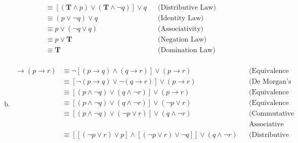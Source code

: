 \begin{itemize}
\begin{enumerate}[a.]
\begin{align*}
                         & \equiv [(\mathbf{T} \land p) \lor (\mathbf{T} \land \neg q)] \lor q &  & \text{(Distributive Law)}                    \\
                         & \equiv (p \lor \neg q) \lor q                                       &  & \text{(Identity Law)}                        \\
                         & \equiv p \lor (\neg q \lor q)                                       &  & \text{(Associativity)}                       \\
                         & \equiv p \lor \mathbf{T}                                            &  & \text{(Negation Law)}                        \\
                         & \equiv \mathbf{T}                                                   &  & \text{(Domination Law)}                      \\
                    \end{align*}
              \item  \begin{align*}
                        [(p \to  q)  \land  (q \to r)] \to (p \to r)
                         & \equiv \neg [(p \to q) \land (q \to r)] \lor (p \to r)                                          &  & \text{(Equivalence from table)} \\
                         & \equiv [\neg (p \to q) \lor \neg (q \to r)] \lor (p \to r)                                      &  & \text{(De Morgan's Law)}        \\
                         & \equiv [(p \land \neg q) \lor (q \land \neg r)] \lor (p \to r)                                  &  & \text{(Equivalence from table)} \\
                         & \equiv [(p \land \neg q) \lor (q \land \neg r)] \lor (\neg p \lor r)                            &  & \text{(Equivalence from table)} \\
                         & \equiv [(p \land \neg q) \lor (\neg p \lor r)] \lor (q \land \neg r)                            &  & \text{(Commutative \&}          \\
                         &                                                                                                 &  & \text{Associative Law)}         \\
                         & \equiv [[(\neg p \lor r) \lor p] \land [(\neg p \lor r) \lor \neg q]] \lor (q \land \neg r)     &  & \text{(Distributive Law)}       \\

\end{align*}
\end{enumerate}
\end{itemize}
